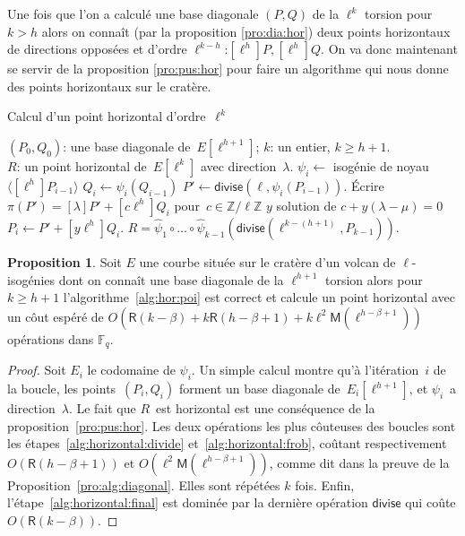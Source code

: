 \documentclass[10pt,a4paper]{book}
\theoremstyle{plain}
\theoremstyle{definition}
\theoremstyle{definition}
\theoremstyle{definition}
\newtheorem{prop}[thm]{Proposition}
\theoremstyle{definition}
\theoremstyle{remark}
\theoremstyle{remark}
\theoremstyle{definition}
\begin{document}
Une fois que l'on a calculé une base diagonale $(P,Q)$ de la $\ell^k$ torsion pour $k>h$ alors on connaît (par la proposition \ref{pro:dia:hor}) deux points horizontaux  de directions opposées et d'ordre $\ell^{k-h}$:$[\ell^{h}]P, [\ell^{h}]Q$. On va donc maintenant se servir de la proposition \ref{pro:pus:hor} pour faire un algorithme qui nous donne des points horizontaux sur le cratère.

\begin{algorithm}
\caption{\label{alg:hor:poi}Calcul d'un point horizontal d'ordre~$\ell^k$}
\begin{algorithmic}[1]
\REQUIRE $(P_0, Q_0)$: une base diagonale de~$E[\ell^{h+1}]$; $k$: un entier,
$k \geqslant h + 1$.\\
\ENSURE $R$: un point horizontal de~$E[\ell^k]$ avec direction~$\lambda$.
\STATE $\psi_i \gets $ isogénie de noyau~$\langle [\ell^{h}] P_{i-1} \rangle$
\STATE $Q_{i} \gets \psi_i(Q_{i-1})$
\STATE\label{alg:horizontal:divide} $P' \gets \mathsf{divise}(\ell, \psi_i(P_{i-1}))$.
\STATE\label{alg:horizontal:frob} \'Ecrire~$\pi(P') = [\lambda] P' + [c \ell^{h}] Q_i$ pour~$c \in \mathbb{Z}/\ell\mathbb{Z}$
\STATE $y$ solution de $c+y(\lambda - \mu)=0$
\STATE  $P_{i} \gets P' + [y \ell^h] Q_i$.
\ENDFOR
\RETURN\label{alg:horizontal:final} $R = \widehat{\psi}_1 \circ … \circ \widehat{\psi}_{k-1}
  (\mathsf{divise}( \ell^{k-(h+1)}, P_{k-1}) )$. 
\end{algorithmic}
\end{algorithm}

\begin{prop}\label{pro:alg:hor}
Soit $E$ une courbe située sur le cratère d'un volcan de $\ell$-isogénies dont 
on connaît une base diagonale de la $\ell^{h+1}$ torsion alors pour 
$k \geqslant h+1$ l'algorithme~\ref{alg:hor:poi} est correct et calcule un 
point horizontal avec un côut espéré de $O(\mathsf{R}(k-\beta) + k\mathsf{R}(h-\beta+1) + k\ell^2\mathsf{M}(\ell^{h-\beta+1}))$
  opérations dans $\mathbb{F}_q$.
\end{prop}
\begin{proof}
Soit $E_i$ le codomaine de $\psi_i$.
Un simple calcul montre qu'à  l'itération~$i$ de la boucle,
les points~$(P_i, Q_i)$ forment un base diagonale de~$E_i[\ell^{h+1}]$,
et $\psi_i$~a direction~$\lambda$.
Le fait que $R$~est horizontal est une conséquence
de la proposition~\ref{pro:pus:hor}.
Les deux opérations les plus côuteuses des boucles sont les
étapes~\ref{alg:horizontal:divide} et~\ref{alg:horizontal:frob},
coûtant respectivement $O(\mathsf{R}(h-\beta+1))$ et 
$O(\ell^2\mathsf{M}(\ell^{h-\beta+1}))$, comme
dit dans la preuve de la Proposition~\ref{pro:alg:diagonal}. Elles sont 
répétées $k$ fois. Enfin, l'étape~\ref{alg:horizontal:final} est
dominée par la dernière opération $\mathsf{divise}$ qui coûte $O(\mathsf{R}(k-\beta))$.
\end{proof}
\end{document}
